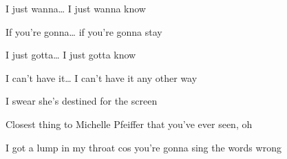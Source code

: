 \begin{song}
\bigskip

\Chorus \par

\bigskip

I just wanna… I just wanna know  \par
{} If you're gonna… if you're gonna stay  \par
{} I just gotta… I just gotta know  \par
{}I can't have it… I can't have it any other way \par

\bigskip

 \par
I  swear she's destined for the screen \par
{}Closest thing to Michelle Pfeiffer that you've ever seen, oh \par

\bigskip


\Chorus {} \par

\bigskip

I got a lump in my throat cos you're gonna sing the words wrong \par

\end{song}
